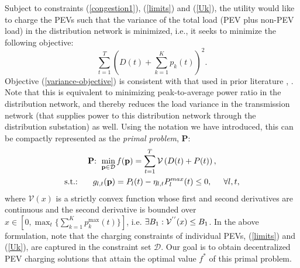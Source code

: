 \documentclass[12pt,draftcls,onecolumn]{IEEEtran}
\begin{document}
\indent Subject to constraints (\ref{congestion1}), (\ref{limits}) and (\ref{Uk}), the utility would like to charge the PEVs such that the variance of the total load (PEV plus non-PEV load) in the distribution network is minimized, i.e., it seeks to minimize the following objective:
\begin{equation}
\sum_{t=1}^{T}\left(D(t)+\sum_{k=1}^{K}p_k(t)\right)^2. \label{variance-objective}
\end{equation}
Objective (\ref{variance-objective}) is consistent with that used in prior literature \cite{MCH10}, \cite{GTL13}. Note that this is equivalent to minimizing peak-to-average power ratio in the distribution network, and thereby reduces the load variance in the transmission network (that supplies power to this distribution network through the distribution substation) as well.
Using the notation we have introduced, this can be compactly represented as the \emph{primal problem}, $\mathbf{P}$:
\begin{gather}
\text{$\mathbf{P}$:    } \min_{\mathbf{p} \in \mathcal{D}} f(\mathbf{p}) = \sum_{t=1}^{T}\mathcal{V}\left(D(t)+P(t)\right), \nonumber \\
\text{s.t.: }\hspace{5mm} g_{l,t}(\mathbf{p})=P_l(t) - \eta_{l,t} P_l^{max}(t) \leq 0, \hspace{5mm} \forall l, t,
\label{minim}
\end{gather}
where $\mathcal{V}(x)$ is a strictly convex function whose first and second derivatives are continuous and the second derivative is bounded over $x \in [0, \max_{t}\{\sum_{k=1}^{K} p_k^{\max}(t)\}]$, i.e.  $\exists B_1: \mathcal{V}^{\rq{}\rq{}}(x) \leq B_1$.
In the above formulation, note that the charging constraints of individual PEVs, (\ref{limits}) and (\ref{Uk}), are captured in the constraint set $\mathcal{D}$. Our goal is to obtain decentralized PEV charging solutions that attain the optimal value $f^*$ of this primal problem.
\end{document}
